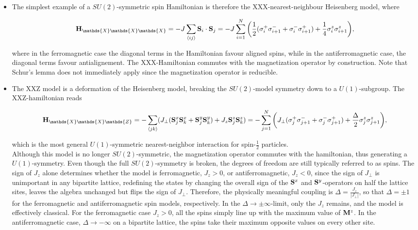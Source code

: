 \documentclass{homework}
\begin{document}
\begin{itemize}
    \item The simplest example of a $SU(2)$-symmetric spin Hamiltonian is therefore the XXX-nearest-neighbour Heisenberg model, where 

\begin{equation}
    \Hamiltonian_{\mathds{X}\mathds{X}\mathds{X}} = -J \sum_{\langle ij \rangle} {\spin}_i \cdot {\spin}_j = -J \sum_{i=1}^{N} \bigg(\frac{1}{2} (\sigma_i^+ \sigma_{i+1}^{-} + \sigma_i^- \sigma_{i+1}^+) + \frac{1}{4} \sigma_i^z \sigma_{i+1}^z\bigg),
\end{equation}

where in the ferromagnetic case the diagonal terms in the Hamiltonian favour aligned spins, while in the antiferromagnetic case, the diagonal terms favour antialignement. The XXX-Hamiltonian commutes with the magnetization operator by construction. Note that Schur's lemma does not immediately apply since the magnetization operator is reducible. \\

\item The XXZ model is a deformation of the Heisenberg model, breaking the $SU(2)$-model symmetry down to a $U(1)$-subgroup. The XXZ-hamiltonian reads

\begin{equation}
    \Hamiltonian_{\mathds{X}\mathds{X}\mathds{Z}} = - \sum_{\langle jk \rangle} (J_\perp (\spin_j^x \spin_k^x + \spin_j^y \spin_k^y) + J_z \spin_j^z \spin_k^z) = - \sum_{j=1}^{N} \bigg( J_\perp (\sigma_{j}^+ \sigma_{j+1}^- + \sigma_{j}^- \sigma_{j+1}^+) + \frac{\Delta}{2} \sigma_j^z \sigma_{j+1}^z \bigg),
    \label{XXZ hamiltonian}
\end{equation}

which is the most general $U(1)$-symmetric nearest-neighbor interaction for spin-$\frac{1}{2}$ particles. \\

Although this model is no longer $SU(2)$-symmetric, the magnetization operator commutes with the hamiltonian, thus generating a $U(1)$-symmetry. Even though the full $SU(2)$-symmetry is broken, the degrees of freedom are still typically referred to as spins. The sign of $J_z$ alone determines whether the model is ferromagnetic, $J_z > 0$, or antiferromagnetic, $J_z < 0$, since the sign of $J_\perp$ is unimportant in any bipartite lattice, redefining the states by changing the overall sign of the ${\bf S}^x$ and ${\bf S}^y$-operators on half the lattice sites, leaves the algebra unchanged but flips the sign of $J_\perp$. Therefore, the physically meaningful coupling is $\Delta = \frac{J_z}{|J_\perp|}$, so that $\Delta = \pm 1$ for the ferromagnetic and antiferromagnetic spin models, respectively. In the $\Delta \rightarrow \pm \infty$-limit, only the $J_z$ remains, and the model is effectively classical. For the ferromagnetic case $J_z > 0$, all the spins simply line up with the maximum value of ${\bf M}^z$. In the antiferromagnetic case, $\Delta \rightarrow -\infty$ on a bipartite lattice, the spins take their maximum opposite values on every other site. \\


\end{itemize}
\end{document}
